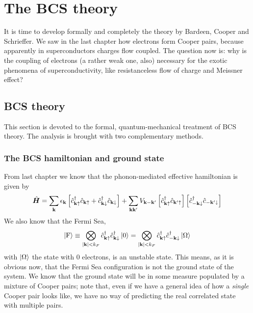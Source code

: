 \chapter{The BCS theory}\chaptertoc{}\label{chap:the bcs theory}

It is time to develop formally and completely the theory by Bardeen, Cooper and Schrieffer. We saw in the last chapter how electrons form Cooper pairs, because apparently in superconductors charges flow coupled. The question now is: why is the coupling of electrons (a rather weak one, also) necessary for the exotic phenomena of superconductivity, like resistanceless flow of charge and Meissner effect?

\section{BCS theory}

This section is devoted to the formal, quantum-mechanical treatment of BCS theory. The analysis is brought with two complementary methods.

\subsection{The BCS hamiltonian and ground state}

From last chapter we know that the phonon-mediated effective hamiltonian is given by
\[
	\hat{\bm H} = \sum_{\mathbf{k}} \epsilon_{\mathbf{k}} \left[{\hat{c}_{\mathbf{k}\uparrow}^\dagger \hat{c}_{\mathbf{k}\uparrow} + \hat{c}_{\mathbf{k}\downarrow}^\dagger \hat{c}_{\mathbf{k}\downarrow}}\right] + \sum_{\mathbf{k}\mathbf{k}'} V_{\mathbf{k}-\mathbf{k}'} \left[{\hat{c}_{\mathbf{k}\uparrow}^\dagger \hat{c}_{\mathbf{k}'\uparrow}}\right] \left[{\hat{c}_{-\mathbf{k}\downarrow}^\dagger \hat{c}_{-\mathbf{k}'\downarrow}}\right]
\]
We also know that the Fermi Sea,
\[
	\ket{\mathrm{F}} \equiv \bigotimes_{\abs{\mathbf{k}} < k_F} \hat{c}_{\mathbf{k}\uparrow}^\dagger \hat{c}_{\mathbf{k}\downarrow}^\dagger \ket{0} = \bigotimes_{\abs{\mathbf{k}} < k_F} \hat{c}_{\mathbf{k}\uparrow}^\dagger \hat{c}_{-\mathbf{k}\downarrow}^\dagger \ket{\Omega}
\]
with $\ket{\Omega}$ the state with $0$ electrons, is an unstable state. This means, as it is obvious now, that the Fermi Sea configuration is not the ground state of the system. We know that the ground state will be in some measure populated by a mixture of Cooper pairs; note that, even if we have a general idea of how a \textit{single} Cooper pair looks like, we have no way of predicting the real correlated state with multiple pairs. 

